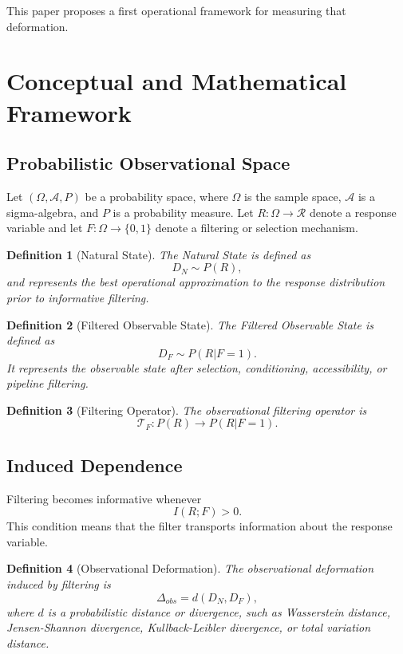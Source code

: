 \documentclass[11pt]{article}
\newtheorem{definition}{Definition}
\begin{document}
This paper proposes a first operational framework for measuring that deformation.

\section{Conceptual and Mathematical Framework}

\subsection{Probabilistic Observational Space}

Let $(\Omega,\mathcal{A},P)$ be a probability space, where $\Omega$ is the sample space, $\mathcal{A}$ is a sigma-algebra, and $P$ is a probability measure. Let $R:\Omega\rightarrow\mathcal{R}$ denote a response variable and let $F:\Omega\rightarrow\{0,1\}$ denote a filtering or selection mechanism.

\begin{definition}[Natural State]
The Natural State is defined as
\[
D_N \sim P(R),
\]
and represents the best operational approximation to the response distribution prior to informative filtering.
\end{definition}

\begin{definition}[Filtered Observable State]
The Filtered Observable State is defined as
\[
D_F \sim P(R|F=1).
\]
It represents the observable state after selection, conditioning, accessibility, or pipeline filtering.
\end{definition}

\begin{definition}[Filtering Operator]
The observational filtering operator is
\[
\mathcal{T}_F:P(R)\rightarrow P(R|F=1).
\]
\end{definition}

\subsection{Induced Dependence}

Filtering becomes informative whenever
\[
I(R;F)>0.
\]
This condition means that the filter transports information about the response variable.

\begin{definition}[Observational Deformation]
The observational deformation induced by filtering is
\[
\Delta_{obs}=d(D_N,D_F),
\]
where $d$ is a probabilistic distance or divergence, such as Wasserstein distance, Jensen-Shannon divergence, Kullback-Leibler divergence, or total variation distance.
\end{definition}
\end{document}
